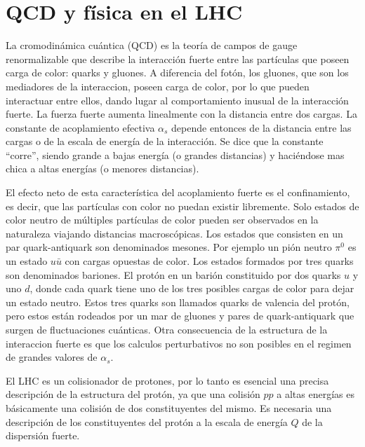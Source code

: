 \section{QCD y física en el LHC}



La cromodinámica cuántica (QCD) \cite{Ellis:1991qj} es la teoría de campos de gauge
renormalizable que describe la interacción fuerte entre las partículas que
poseen carga de color: quarks y gluones. A diferencia del fotón, los gluones,
que son los mediadores de la interaccion, poseen carga de color, por lo que
pueden interactuar entre ellos, dando lugar al comportamiento inusual de la
interacción fuerte. La fuerza fuerte aumenta linealmente con la distancia entre
dos cargas. La constante de acoplamiento efectiva $\alpha_s$ depende entonces de
la distancia entre las cargas o de la escala de energía de la interacción. Se
dice que la constante ``corre'', siendo grande a bajas energía (o grandes
distancias) y haciéndose mas chica a altas energías (o menores distancias).

El efecto neto de esta característica del acoplamiento fuerte es el
confinamiento, es decir, que las partículas con color no puedan existir
libremente. Solo estados de color neutro de múltiples partículas de color pueden
ser observados en la naturaleza viajando distancias macroscópicas. Los estados
que consisten en un par quark-antiquark son denominados mesones. Por ejemplo un
pión neutro $\pi^0$ es un estado $u\bar{u}$ con cargas opuestas de color. Los
estados formados por tres quarks son denominados bariones. El protón en un
barión constituido por dos quarks $u$ y uno $d$, donde cada quark tiene uno de
los tres posibles cargas de color para dejar un estado neutro. Estos tres quarks
son llamados quarks de valencia del protón, pero estos están rodeados por un mar
de gluones y pares de quark-antiquark que surgen de fluctuaciones cuánticas.
Otra consecuencia de la estructura de la interaccion fuerte es que los calculos
perturbativos no son posibles en el regimen de grandes valores de $\alpha_s$.

El LHC es un colisionador de protones, por lo tanto es esencial una precisa
descripción de la estructura del protón, ya que una colisión $pp$ a altas
energías es básicamente una colisión de dos constituyentes del mismo. Es
necesaria una descripción de los constituyentes del protón a la escala de
energía $Q$ de la dispersión fuerte.

